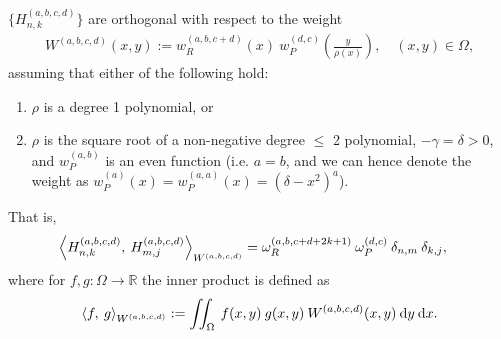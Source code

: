 \documentclass[11pt, oneside]{article}   	%
\newcommand{\R}{\mathbb{R}}
\newcommand{\hdop}{H}
\newcommand{\hdopnk}{\hdop_{n,k}}
\newcommand{\hdopmj}{\hdop_{m,j}}
\newcommand{\genjac}{R}
\newcommand{\genjacw}{w_\genjac}
\newcommand{\jacw}{w_P}
\newcommand{\normgenjac}{\omega_\genjac}
\newcommand{\normjac}{\omega_P}
\begin{document}
 $\{\hdopnk^{(a,b,c,d)}\}$ are orthogonal with respect to the weight
\begin{align*}
	W^{(a,b,c,d)}(x,y) := \genjacw^{(a,b,c+d)}(x) \: \jacw^{(d,c)}(\frac{y}{\rho(x)}), \quad (x,y) \in \Omega,
\end{align*}
assuming that either of the following hold:
\begin{enumerate}
\item  \(\rho\) is a degree 1 polynomial, or 
\item \(\rho\) is the square root of a non-negative degree \(\le\) 2 polynomial, \(-\gamma = \delta > 0\), and \(\jacw^{(a,b)}\) is an even function (i.e. $a = b$, and we can hence denote the weight as $\jacw^{(a)}(x) = w^{(a,a)}_P(x) =  (\delta-x^2)^a$).
\end{enumerate}
That is,
\begin{align*}
	\ip< \hdopnk^{(a,b,c,d)}, \: \hdopmj^{(a,b,c,d)} >_{W^{(a,b,c,d)}} &= \normgenjac^{(a,b,c+d+2k+1)} \: \normjac^{(d,c)} \: \delta_{n,m} \: \delta_{k,j},
\end{align*}
where for $f, g : \Omega \to \R$ the inner product is defined as 
\begin{align*}
	\ip< f, \: g >_{W^{(a,b,c,d)}} := \iint_\Omega \: f(x,y) \: g(x,y) \: W^{(a,b,c,d)}(x,y) \: \D y \: \D x.
\end{align*}
\end{document}
